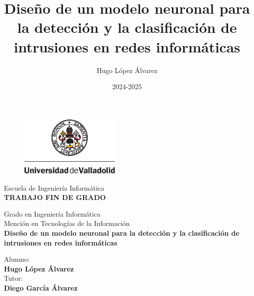 \documentclass[openright,twoside,10pt]{book}
\date{2024-2025}
\author{Hugo López Álvarez}
\title{Diseño de un modelo neuronal para la detección y la clasificación de intrusiones en redes informáticas}
\begin{document}
\begin{titlepage}

\begin{center}
\vspace*{-0.5in}
\begin{figure}[htb]
\begin{center}
\includegraphics[width=5cm]{./img/uva}
\end{center}
\end{figure}

\vspace*{0.3in}
\huge
{\selectfont Escuela de Ingeniería Informática}
\\
\vspace*{0.5in}
\large
{\selectfont \textbf{\textsc{\textsc{TRABAJO FIN DE GRADO}}}}

	
\vspace*{0.2in}
\selectfont Grado en Ingeniería Informática\\
\selectfont Mención en Tecnologías de la Información\\
\vspace*{0.8in}
\huge
{\selectfont\textbf{Diseño de un modelo neuronal para la detección y la clasificación de intrusiones en redes informáticas}}
\vspace*{1in}
\begin{large}
\begin{flushright}
Alumno:\\\textbf{Hugo López Álvarez}\\
\vspace*{0.3in}
Tutor:\\ \textbf{Diego García Álvarez}\\
\end{flushright}
\end{large}
\end{center}

\end{titlepage}

\newpage
\mbox{}	
\thispagestyle{empty} %
\end{document}
